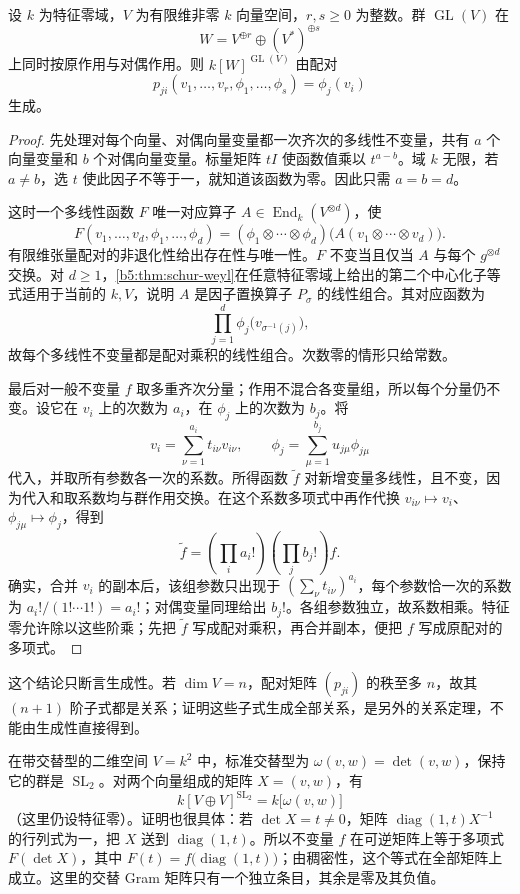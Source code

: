 \begin{theorem}[一般线性群的配对不变量]\label{b5:thm:gl-pairing-fft}
	设 \(k\) 为特征零域，\(V\) 为有限维非零 \(k\) 向量空间，\(r,s\ge0\) 为整数。群 \(\operatorname{GL}(V)\) 在
	\[
		W=V^{\oplus r}\oplus(V^*)^{\oplus s}
	\]
	上同时按原作用与对偶作用。则 \(k[W]^{\operatorname{GL}(V)}\) 由配对
	\[
		p_{ji}(v_1,\ldots,v_r,\phi_1,\ldots,\phi_s)=\phi_j(v_i)
	\]
	生成。
\end{theorem}
\begin{proof}
	先处理对每个向量、对偶向量变量都一次齐次的多线性不变量，共有 \(a\) 个向量变量和 \(b\) 个对偶向量变量。标量矩阵 \(tI\) 使函数值乘以 \(t^{a-b}\)。域 \(k\) 无限，若 \(a\ne b\)，选 \(t\) 使此因子不等于一，就知道该函数为零。因此只需 \(a=b=d\)。

	这时一个多线性函数 \(F\) 唯一对应算子 \(A\in\operatorname{End}_k(V^{\otimes d})\)，使
	\[
		F(v_1,\ldots,v_d,\phi_1,\ldots,\phi_d) =(\phi_1\otimes\cdots\otimes\phi_d) \bigl(A(v_1\otimes\cdots\otimes v_d)\bigr).
	\]
	有限维张量配对的非退化性给出存在性与唯一性。\(F\) 不变当且仅当 \(A\) 与每个 \(g^{\otimes d}\) 交换。对 \(d\ge1\)，\cref{b5:thm:schur-weyl}在任意特征零域上给出的第二个中心化子等式适用于当前的 \(k,V\)，说明 \(A\) 是因子置换算子 \(P_\sigma\) 的线性组合。其对应函数为
	\[
		\prod_{j=1}^d\phi_j\bigl(v_{\sigma^{-1}(j)}\bigr),
	\]
	故每个多线性不变量都是配对乘积的线性组合。次数零的情形只给常数。

	最后对一般不变量 \(f\) 取多重齐次分量；作用不混合各变量组，所以每个分量仍不变。设它在 \(v_i\) 上的次数为 \(a_i\)，在 \(\phi_j\) 上的次数为 \(b_j\)。将
	\[
		v_i=\sum_{\nu=1}^{a_i}t_{i\nu}v_{i\nu},\qquad \phi_j=\sum_{\mu=1}^{b_j}u_{j\mu}\phi_{j\mu}
	\]
	代入，并取所有参数各一次的系数。所得函数 \(\widetilde f\) 对新增变量多线性，且不变，因为代入和取系数均与群作用交换。在这个系数多项式中再作代换 \(v_{i\nu}\mapsto v_i\)、\(\phi_{j\mu}\mapsto\phi_j\)，得到
	\[
		\widetilde f=\left(\prod_i a_i!\right) \left(\prod_j b_j!\right)f.
	\]
	确实，合并 \(v_i\) 的副本后，该组参数只出现于 \((\sum_\nu t_{i\nu})^{a_i}\)，每个参数恰一次的系数为 \(a_i!/(1!\cdots1!)=a_i!\)；对偶变量同理给出 \(b_j!\)。各组参数独立，故系数相乘。特征零允许除以这些阶乘；先把 \(\widetilde f\) 写成配对乘积，再合并副本，便把 \(f\) 写成原配对的多项式。
\end{proof}

这个结论只断言生成性。若 \(\dim V=n\)，配对矩阵 \((p_{ji})\) 的秩至多 \(n\)，故其 \((n+1)\) 阶子式都是关系；证明这些子式生成全部关系，是另外的关系定理，不能由生成性直接得到。

\ProseParagraphBreak
在带交替型的二维空间 \(V=k^2\) 中，标准交替型为 \(\omega(v,w)=\det(v,w)\)，保持它的群是 \(\operatorname{SL}_2\)。对两个向量组成的矩阵 \(X=(v,w)\)，有
\[
	k[V\oplus V]^{\operatorname{SL}_2}=k\bigl[\omega(v,w)\bigr]
\]
（这里仍设特征零）。证明也很具体：若 \(\det X=t\ne0\)，矩阵 \(\operatorname{diag}(1,t)X^{-1}\) 的行列式为一，把 \(X\) 送到 \(\operatorname{diag}(1,t)\)。所以不变量 \(f\) 在可逆矩阵上等于多项式 \(F(\det X)\)，其中 \(F(t)=f\bigl(\operatorname{diag}(1,t)\bigr)\)；由稠密性，这个等式在全部矩阵上成立。这里的交替 Gram 矩阵只有一个独立条目，其余是零及其负值。

